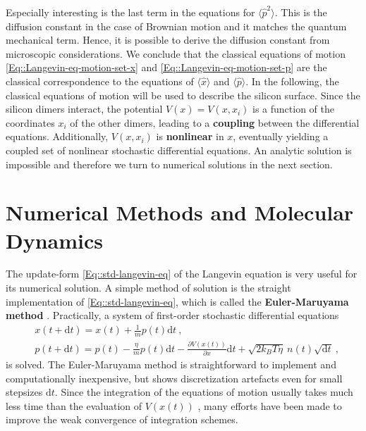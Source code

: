 	Especially interesting is the last term in the equations for $\langle \hat{p}^2 \rangle$. This is the diffusion constant in the case of Brownian motion and it matches the quantum mechanical term. Hence, it is possible to derive the diffusion constant from microscopic considerations. We conclude that the classical equations of motion \autoref{Eq::Langevin-eq-motion-set-x} and \autoref{Eq::Langevin-eq-motion-set-p} are the classical correspondence to the equations of $\langle \hat{x} \rangle$ and $\langle \hat{p} \rangle$. In the following, the classical equations of motion will be used to describe the silicon surface. Since the silicon dimers interact, the potential $V(x) =	V(x, {x_i})$ is a function of the coordinates $x_i$ of the other dimers, leading to a \textbf{coupling} between the differential equations. Additionally, $V(x, {x_i})$ is \textbf{nonlinear} in $x$, eventually yielding a coupled set of nonlinear stochastic differential equations. An analytic solution is impossible and therefore we turn to numerical solutions in the next section.
	\section{Numerical Methods and Molecular Dynamics} \label{Section::Numerical-methods}
	The update-form \autoref{Eq::std-langevin-eq} of the Langevin equation is very useful for its numerical solution. A simple method of solution is the straight implementation of \autoref{Eq::std-langevin-eq}, which is called the \textbf{Euler-Maruyama method} \cite{kloeden1992stochastic}. Practically, a system of first-order stochastic differential equations
	\begin{align}
		&x(t + \text{d}t) = x(t)	+ \frac{1}{m} p(t) \text{d}t ~, \\
		&p(t + \text{d}t) =	p(t) - \frac{\eta}{m} p(t) \text{d}t - \frac{\partial V(x(t))}{\partial x} \text{d}t + \sqrt{2 k_B T \eta} ~ n(t) \sqrt{\text{d}t} ~,
	\end{align}
	is solved. The Euler-Maruyama method is straightforward to implement and computationally inexpensive, but shows discretization artefacts even for small stepsizes $\text{d}t$. Since the integration of the equations of motion usually takes much less time than the evaluation of $V(x(t))$ \cite{frenkel2023understanding}, many efforts have been made to improve the weak convergence \cite{kloeden1992stochastic} of integration schemes. \\
	

